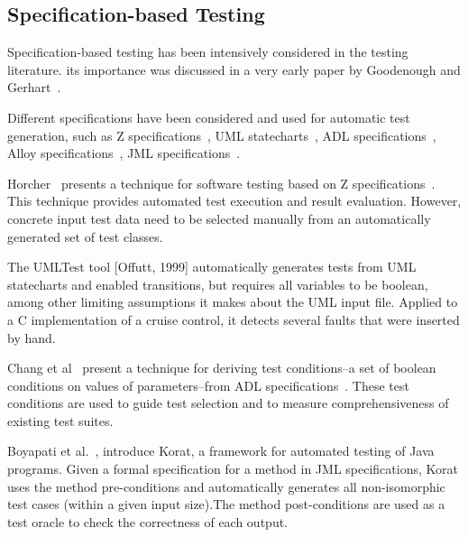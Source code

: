 

\subsection{Specification-based Testing}
Specification-based testing has been intensively considered in the testing literature.  its importance was discussed in a very early paper by Goodenough and Gerhart~\cite{Goodenough1975}.

Different specifications have been considered and used for automatic test generation, such as  Z specifications~\cite{Spivey1992,Horcher1995,Stocks1996,Donat1997}, UML statecharts~\cite{Rumbaugh1999,Offutt1999}, ADL specifications~\cite{Sankar1994,Chang1999}, Alloy specifications~\cite{Jackson2002,Khurshid2004,Coppit2005}, JML specifications~\cite{Boyapati2002}.

Horcher~\cite{Horcher1995} presents a technique for software testing based on Z specifications~\cite{Spivey1992}. This technique provides automated test execution and result evaluation. However, concrete input test data need to be selected manually from an
automatically generated set of test classes.

The UMLTest tool [Offutt, 1999] automatically generates tests from UML statecharts and enabled transitions, but requires all variables to be boolean, among other limiting assumptions it makes about the UML input file. Applied to a C implementation of a cruise control, it detects several faults that were inserted by hand. 

Chang et al~\cite{Chang1999} present a technique for deriving test conditions--a set of boolean conditions on values of parameters--from ADL specifications~\cite{Sankar1994}. These test conditions are used to guide test selection and to measure comprehensiveness of existing test suites.

Boyapati et al.~\cite{Boyapati2002}, introduce Korat, a framework for automated testing of Java programs. Given a formal specification for a method in JML specifications, Korat uses the method pre-conditions and automatically generates all non-isomorphic test cases (within a given input size).The method post-conditions are used as a test oracle to check the correctness of each output.

